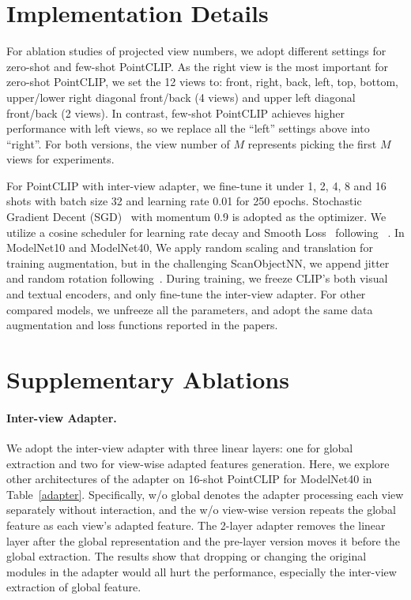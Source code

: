 \documentclass[10pt,twocolumn,letterpaper]{article}
\begin{document}
\section{Implementation Details}
For ablation studies of projected view numbers, we adopt different settings for zero-shot and few-shot PointCLIP. As the right view is the most important for zero-shot PointCLIP, we set the 12 views to: front, right, back, left, top, bottom, upper/lower right diagonal front/back (4 views) and upper left diagonal front/back (2 views). In contrast, few-shot PointCLIP achieves higher performance with left views, so we replace all the ``left'' settings above into ``right''. For both versions, the view number of $M$ represents picking the first $M$ views for experiments.

For PointCLIP with inter-view adapter, we fine-tune it under 1, 2, 4, 8 and 16 shots with batch size 32 and learning rate 0.01 for 250 epochs. Stochastic Gradient Decent (SGD)~\cite{kingma2014adam} with momentum 0.9 is adopted as the optimizer. We utilize a cosine scheduler for learning rate decay and Smooth Loss~\cite{wang2019dynamic} following ~\cite{goyal2021revisiting}. In ModelNet10 and ModelNet40, We apply random scaling and translation for training augmentation, but in the challenging ScanObjectNN, we append jitter and random rotation following~\cite{qi2017pointnet}. During training, we freeze CLIP's both visual and textual encoders, and only fine-tune the inter-view adapter. For other compared models, we unfreeze all the parameters, and adopt the same data augmentation and loss functions reported in the papers.
\section{Supplementary Ablations}
\paragraph{Inter-view Adapter.}
We adopt the inter-view adapter with three linear layers: one for global extraction and two for view-wise adapted features generation. Here, we explore other architectures of the adapter on 16-shot PointCLIP for ModelNet40 in Table~\ref{adapter}. Specifically, w/o global denotes the adapter processing each view separately without interaction, and the w/o view-wise version repeats the global feature as each view's adapted feature. The 2-layer adapter removes the linear layer after the global representation and the pre-layer version moves it before the global extraction. The results show that dropping or changing the original modules in the adapter would all hurt the performance, especially the inter-view extraction of global feature.
\end{document}

